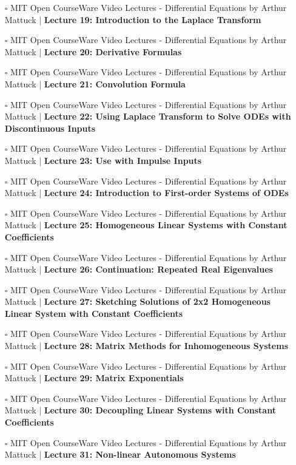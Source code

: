 \documentclass[a4, landscape, 12pt]{article}
\newcommand{\checkbox}{$\square$}%
\begin{document}
\begin{itemize}
{}
\item [\checkbox] MIT Open CourseWare Video Lectures - Differential Equations by Arthur Mattuck  | \textbf{Lecture 19: Introduction to the Laplace Transform
}
\item [\checkbox] MIT Open CourseWare Video Lectures - Differential Equations by Arthur Mattuck  | \textbf{Lecture 20: Derivative Formulas
}
\item [\checkbox] MIT Open CourseWare Video Lectures - Differential Equations by Arthur Mattuck  | \textbf{Lecture 21: Convolution Formula
}
\item [\checkbox] MIT Open CourseWare Video Lectures - Differential Equations by Arthur Mattuck  | \textbf{Lecture 22: Using Laplace Transform to Solve ODEs with Discontinuous Inputs
}
\item [\checkbox] MIT Open CourseWare Video Lectures - Differential Equations by Arthur Mattuck  | \textbf{Lecture 23: Use with Impulse Inputs
}
\item [\checkbox] MIT Open CourseWare Video Lectures - Differential Equations by Arthur Mattuck  | \textbf{Lecture 24: Introduction to First-order Systems of ODEs
}
\item [\checkbox] MIT Open CourseWare Video Lectures - Differential Equations by Arthur Mattuck  | \textbf{Lecture 25: Homogeneous Linear Systems with Constant Coefficients
}
\item [\checkbox] MIT Open CourseWare Video Lectures - Differential Equations by Arthur Mattuck  | \textbf{Lecture 26: Continuation: Repeated Real Eigenvalues
}
\item [\checkbox] MIT Open CourseWare Video Lectures - Differential Equations by Arthur Mattuck  | \textbf{Lecture 27: Sketching Solutions of 2x2 Homogeneous Linear System with Constant Coefficients
}
\item [\checkbox] MIT Open CourseWare Video Lectures - Differential Equations by Arthur Mattuck  | \textbf{Lecture 28: Matrix Methods for Inhomogeneous Systems
}
\item [\checkbox] MIT Open CourseWare Video Lectures - Differential Equations by Arthur Mattuck  | \textbf{Lecture 29: Matrix Exponentials
}
\item [\checkbox] MIT Open CourseWare Video Lectures - Differential Equations by Arthur Mattuck  | \textbf{Lecture 30: Decoupling Linear Systems with Constant Coefficients
}
\item [\checkbox] MIT Open CourseWare Video Lectures - Differential Equations by Arthur Mattuck  | \textbf{Lecture 31: Non-linear Autonomous Systems
}
\end{itemize}
\end{document}
